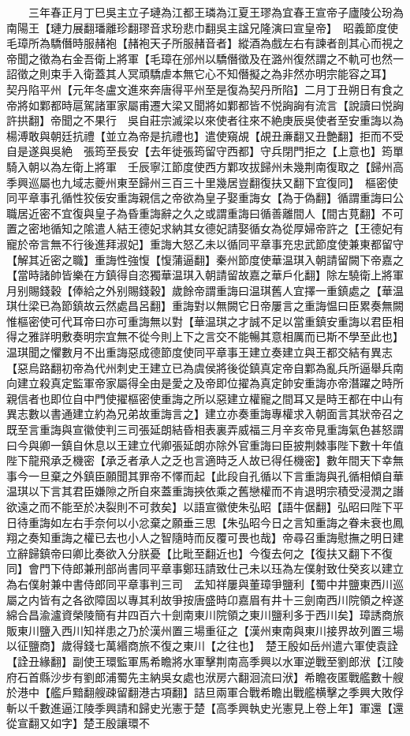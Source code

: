 　　三年春正月丁巳吳主立子璉為江都王璘為江夏王璆為宜春王宣帝子廬陵公玢為南陽王【璉力展翻璠離珍翻璆音求玢悲巾翻吳主諡兄隆演曰宣皇帝】　昭義節度使毛璋所為驕僭時服赭袍【赭袍天子所服赭音者】縱酒為戲左右有諫者剖其心而視之帝聞之徵為右金吾衛上將軍【毛璋在邠州以驕僭徵及在潞州復然謂之不軌可也然一詔徵之則束手入衛蓋其人冥頑驕虐本無它心不知僭擬之為非然亦明宗能容之耳】　契丹陷平州【元年冬盧文進來奔唐得平州至是復為契丹所陷】二月丁丑朔日有食之　帝將如鄴都時扈駕諸軍家屬甫遷大梁又聞將如鄴都皆不悦詾詾有流言【說讀曰悦詾許拱翻】帝聞之不果行　吳自莊宗滅梁以來使者往來不絶庚辰吳使者至安重誨以為楊溥敢與朝廷抗禮【並立為帝是抗禮也】遣使窺覘【覘丑亷翻又丑艶翻】拒而不受自是遂與吳絶　張筠至長安【去年徙張筠留守西都】守兵閉門拒之【上意也】筠單騎入朝以為左衛上將軍　壬辰寧江節度使西方鄴攻拔歸州未幾荆南復取之【歸州高季興巡屬也九域志夔州東至歸州三百三十里幾居豈翻復扶又翻下宜復同】　樞密使同平章事孔循性狡佞安重誨親信之帝欲為皇子娶重誨女【為于偽翻】循謂重誨曰公職居近密不宜復與皇子為昏重誨辭之久之或謂重誨曰循善離間人【間古莧翻】不可置之密地循知之隂遣人結王德妃求納其女德妃請娶循女為從厚婦帝許之【王德妃有寵於帝言無不行後進拜淑妃】重誨大怒乙未以循同平章事充忠武節度使兼東都留守【解其近密之職】重誨性強愎【愎蒲逼翻】秦州節度使華温琪入朝請留闕下帝嘉之【當時諸帥皆樂在方鎮得自恣獨華温琪入朝請留故嘉之華戶化翻】除左驍衛上將軍月别賜錢穀【俸給之外别賜錢穀】歲餘帝謂重誨曰温琪舊人宜擇一重鎮處之【華温琪仕梁已為節鎮故云然處昌呂翻】重誨對以無闕它日帝屢言之重誨愠曰臣累奏無闕惟樞密使可代耳帝曰亦可重誨無以對【華温琪之才誠不足以當重鎮安重誨以君臣相得之雅詳明敷奏明宗宜無不從今則上下之言交不能暢其意相厲而已斯不學至此也】温琪聞之懼數月不出重誨惡成德節度使同平章事王建立奏建立與王都交結有異志【惡烏路翻初帝為代州刺史王建立已為虞侯將後從鎮真定帝自鄴為亂兵所逼舉兵南向建立殺真定監軍帝家屬得全由是愛之及帝即位擢為真定帥安重誨亦帝潛躍之時所親信者也即位自中門使擢樞密使重誨之所以惡建立權寵之間耳又是時王都在中山有異志數以書通建立約為兄弟故重誨言之】建立亦奏重誨專權求入朝面言其狀帝召之既至言重誨與宣徽使判三司張延朗結昏相表裏弄威福三月辛亥帝見重誨氣色甚怒謂曰今與卿一鎮自休息以王建立代卿張延朗亦除外官重誨曰臣披荆棘事陛下數十年值陛下龍飛承乏機密【承乏者承人之乏也言適時乏人故已得任機密】數年間天下幸無事今一旦棄之外鎮臣願聞其罪帝不懌而起【此段自孔循以下言重誨與孔循相傾自華温琪以下言其君臣嫌隙之所自來蓋重誨挾依乘之舊戀權而不肯退明宗積受浸潤之譖欲遠之而不能至於决裂則不可救矣】以語宣徽使朱弘昭【語牛倨翻】弘昭曰陛下平日待重誨如左右手奈何以小忿棄之願垂三思【朱弘昭今日之言知重誨之眷未衰也鳳翔之奏知重誨之權已去也小人之智隨時而反覆可畏也哉】帝尋召重誨慰撫之明日建立辭歸鎮帝曰卿比奏欲入分朕憂【比毗至翻近也】今復去何之【復扶又翻下不復同】會門下侍郎兼刑部尚書同平章事鄭珏請致仕己未以珏為左僕射致仕癸亥以建立為右僕射兼中書侍郎同平章事判三司　孟知祥屢與董璋爭鹽利【蜀中井鹽東西川巡屬之内皆有之各欲障固以專其利故爭按唐盛時卬嘉眉有井十三劍南西川院領之梓遂綿合昌渝瀘資榮陵簡有井四百六十劍南東川院領之東川鹽利多于西川矣】璋誘商旅販東川鹽入西川知祥患之乃於漢州置三場重征之【漢州東南與東川接界故列置三場以征鹽商】歲得錢七萬緡商旅不復之東川【之往也】　楚王殷如岳州遣六軍使袁詮【詮丑緣翻】副使王環監軍馬希瞻將水軍擊荆南高季興以水軍逆戰至劉郎洑【江陵府石首縣沙步有劉郎浦蜀先主納吳女處也洑房六翻洄流曰洑】希瞻夜匿戰艦數十艘於港中【艦戶黯翻艘疎留翻港古項翻】詰旦兩軍合戰希瞻出戰艦横擊之季興大敗俘斬以千數進逼江陵季興請和歸史光憲于楚【高季興執史光憲見上卷上年】軍還【還從宣翻又如字】楚王殷讓環不
